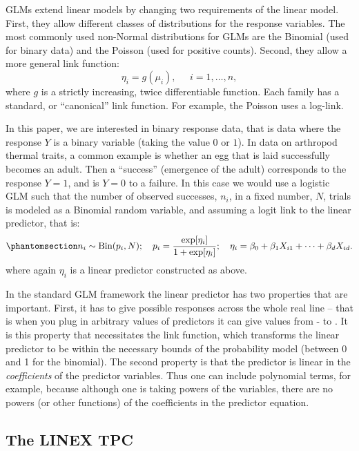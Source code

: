 \documentclass[
]{article}
\begin{document}
GLMs extend linear models by changing two requirements of the linear
model. First, they allow different classes of distributions for the
response variables. The most commonly used non-Normal distributions for
GLMs are the Binomial (used for binary data) and the Poisson (used for
positive counts). Second, they allow a more general link function: \[
\eta_i = g(\mu_i), \;\;\;\;\; i=1,\dots,n,
\] where \(g\) is a strictly increasing, twice differentiable function.
Each family has a standard, or ``canonical'' link function. For example,
the Poisson uses a log-link.

In this paper, we are interested in binary response data, that is data
where the response \(Y\) is a binary variable (taking the value \(0\) or
\(1\)). In data on arthropod thermal traits, a common example is whether
an egg that is laid successfully becomes an adult. Then a ``success''
(emergence of the adult) corresponds to the response \(Y=1\), and is
\(Y=0\) to a failure. In this case we would use a logistic GLM such that
the number of observed successes, \(n_i\), in a fixed number, \(N\),
trials is modeled as a Binomial random variable, and assuming a logit
link to the linear predictor, that is:
\begin{equation}\phantomsection\label{eq-logistic}{
n_i \sim \mathrm{Bin}(p_i, N); ~~~ p_i = \frac{\exp[\eta_i]}{1+\exp[\eta_i]}; ~~~ \eta_i = \beta_0 + \beta_1 X_{i1} + \cdots + \beta_d X_{id}. 
}\end{equation} where again \(\eta_i\) is a linear predictor constructed
as above.

In the standard GLM framework the linear predictor has two properties
that are important. First, it has to give possible responses across the
whole real line -- that is when you plug in arbitrary values of
predictors it can give values from -\infty{} to \infty{}. It is this
property that necessitates the link function, which transforms the
linear predictor to be within the necessary bounds of the probability
model (between 0 and 1 for the binomial). The second property is that
the predictor is linear in the \emph{coefficients} of the predictor
variables. Thus one can include polynomial terms, for example, because
although one is taking powers of the variables, there are no powers (or
other functions) of the coefficients in the predictor equation.

\subsection{The LINEX TPC}\label{the-linex-tpc}
\end{document}
